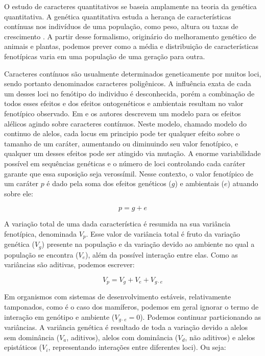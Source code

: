 O estudo de caracteres quantitativos se baseia amplamente na teoria da
genética quantitativa.
A genética quantitativa estuda a herança de características contínuas
nos indivíduos de uma população, como peso, altura ou taxas de
crescimento \citep{Falconer1996}.
A partir desse formalismo, originário do melhoramento genético de animais e plantas, 
podemos prever como a média e distribuição de
características fenotípicas varia em uma população de uma geração para
outra.

Caracteres contínuos são usualmente determinados geneticamente por muitos loci,
sendo portanto denominados caracteres poligênicos.
A influência exata de cada um desses loci no fenótipo do individuo é
desconhecida, porém a combinação de todos esses efeitos e dos efeitos
ontogenéticos e ambientais resultam no valor fenotípico observado.
Em \cite{Crow1964} e \cite{Kimura1965} os autores descrevem um modelo
para os efeitos alélicos agindo sobre caracteres contínuos.
Neste modelo, chamado modelo do continuo de alelos, cada locus em
principio pode ter qualquer efeito sobre o tamanho de um caráter,
aumentando ou diminuindo seu valor fenotípico, e
qualquer um desses efeitos pode ser atingido via mutação.
A enorme variabilidade possível em sequências genéticas e o número de
loci controlando cada caráter garante que essa suposição seja verossímil.
Nesse contexto, o valor fenotípico de um caráter $p$ é dado pela soma dos
efeitos genéticos ($g$) e ambientais ($e$) atuando sobre ele:

\begin{equation}
    p = g + e
\end{equation}

A variação total de uma dada característica é resumida na sua variância
fenotípica, denominada $V_p$.
Esse valor de variância total é fruto da variação genética ($V_g$)
presente na população e da variação devido ao ambiente no qual a
população se encontra ($V_e$), além da possível interação entre elas.
Como as variâncias são aditivas, podemos escrever:

\begin{equation}
    V_p = V_g + V_e + V_{g \cdot e}
\end{equation}

Em organismos com sistemas de desenvolvimento estáveis, relativamente tamponados,
como é o caso dos mamíferos, podemos em geral ignorar o termo de interação em
genótipo e ambiente ($V_{g \cdot e} = 0$).
Podemos continuar particionando as variâncias.
A variância genética é resultado de toda a variação devido a alelos sem
dominância ($V_a$, aditivos), alelos com dominância ($V_d$, não
aditivos) e alelos epistáticos ($V_{i}$, representando interações entre
diferentes loci).
Ou seja:


